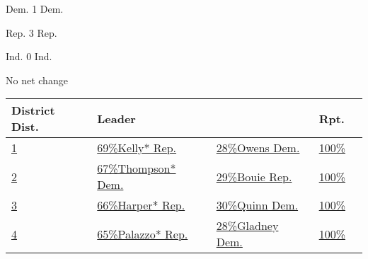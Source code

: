 Dem. 1 Dem.

Rep. 3 Rep.

Ind. 0 Ind.

No net change

\begin{longtable}[]{@{}lllll@{}}
\toprule
District Dist. & Leader & & Rpt. &\tabularnewline
\midrule
\endhead
\href{//www.nytimes3xbfgragh.onion/elections/2016/results/mississippi-house-district-1-kelly-owens}{1}
&
\href{//www.nytimes3xbfgragh.onion/elections/2016/results/mississippi-house-district-1-kelly-owens}{
69\%Kelly* Rep.} &
\href{//www.nytimes3xbfgragh.onion/elections/2016/results/mississippi-house-district-1-kelly-owens}{
28\%Owens Dem.} &
\href{//www.nytimes3xbfgragh.onion/elections/2016/results/mississippi-house-district-1-kelly-owens}{100\%}
&
\href{//www.nytimes3xbfgragh.onion/elections/2016/results/mississippi-house-district-1-kelly-owens}{}\tabularnewline
\href{//www.nytimes3xbfgragh.onion/elections/2016/results/mississippi-house-district-2-thompson-bouie}{2}
&
\href{//www.nytimes3xbfgragh.onion/elections/2016/results/mississippi-house-district-2-thompson-bouie}{
67\%Thompson* Dem.} &
\href{//www.nytimes3xbfgragh.onion/elections/2016/results/mississippi-house-district-2-thompson-bouie}{
29\%Bouie Rep.} &
\href{//www.nytimes3xbfgragh.onion/elections/2016/results/mississippi-house-district-2-thompson-bouie}{100\%}
&
\href{//www.nytimes3xbfgragh.onion/elections/2016/results/mississippi-house-district-2-thompson-bouie}{}\tabularnewline
\href{//www.nytimes3xbfgragh.onion/elections/2016/results/mississippi-house-district-3-harper-quinn}{3}
&
\href{//www.nytimes3xbfgragh.onion/elections/2016/results/mississippi-house-district-3-harper-quinn}{
66\%Harper* Rep.} &
\href{//www.nytimes3xbfgragh.onion/elections/2016/results/mississippi-house-district-3-harper-quinn}{
30\%Quinn Dem.} &
\href{//www.nytimes3xbfgragh.onion/elections/2016/results/mississippi-house-district-3-harper-quinn}{100\%}
&
\href{//www.nytimes3xbfgragh.onion/elections/2016/results/mississippi-house-district-3-harper-quinn}{}\tabularnewline
\href{//www.nytimes3xbfgragh.onion/elections/2016/results/mississippi-house-district-4-palazzo-gladney}{4}
&
\href{//www.nytimes3xbfgragh.onion/elections/2016/results/mississippi-house-district-4-palazzo-gladney}{
65\%Palazzo* Rep.} &
\href{//www.nytimes3xbfgragh.onion/elections/2016/results/mississippi-house-district-4-palazzo-gladney}{
28\%Gladney Dem.} &
\href{//www.nytimes3xbfgragh.onion/elections/2016/results/mississippi-house-district-4-palazzo-gladney}{100\%}
&
\href{//www.nytimes3xbfgragh.onion/elections/2016/results/mississippi-house-district-4-palazzo-gladney}{}\tabularnewline
\bottomrule
\end{longtable}

